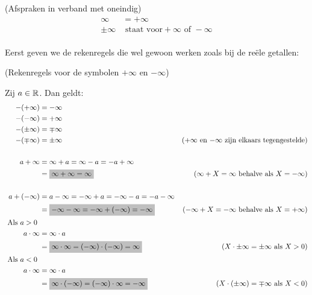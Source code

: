 \documentclass{ximera}
\begin{document}
\begin{notation} (Afspraken in verband met oneindig)	
	\begin{align*}
	\infty & = +\infty   \\
	\pm\infty &\text{ staat voor} +\infty \text{ of } -\infty \\
	\end{align*}
\end{notation}


Eerst geven we de rekenregels die wel gewoon werken zoals bij de reële getallen:


\begin{proposition} (Rekenregels voor de symbolen $+\infty$ en $-\infty$)

	Zij $a\in\mathbb{R}$. Dan geldt:	
	\begin{align*}
	-(+\infty) & = -\infty \\
	-(-\infty) & = +\infty  \\
	-(\pm\infty) &= \mp\infty \\
	-(\mp\infty) &= \pm\infty & \text{($+\infty$ en $-\infty$ zijn elkaars tegengestelde)}\\ 
	\\
	a+\infty & = \infty+a = \infty - a = -a +\infty \\
	& = \important{\infty + \infty = \infty} & \text{($\infty + X =\infty$ behalve als $X=-\infty$)} \\
	\\
	a+(-\infty) & = a-\infty = -\infty+a =-\infty - a = -a - \infty \\
	& = \important{-\infty - \infty = -\infty+(-\infty) = -\infty} & \text{($-\infty+X=-\infty$ behalve als $X=+\infty$)} \\
	\mbox{ Als $a>0$ }\\%
	a\cdot\infty & = \infty\cdot a \\
	& = \important{\infty \cdot \infty = (-\infty) \cdot (-\infty) = \infty} & \text{($X\cdot\pm\infty=\pm\infty$ als $X>0$)} \\
	\mbox{Als $a<0$ } \\%
		a\cdot\infty & = \infty\cdot a \\
	& = \important{\infty \cdot (-\infty) = (-\infty)\cdot\infty = -\infty} & \text{($X\cdot(\pm\infty) = \mp\infty$ als $X<0$)} \\
	\end{align*}	
\end{proposition}  
\end{document}
